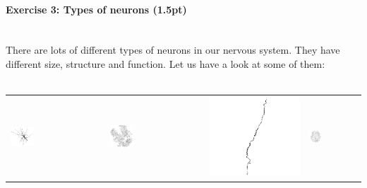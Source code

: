 \documentclass[a4paper,11pt]{article}
\newenvironment{exercise}[3]{\paragraph{Exercise #1: #2 (#3pt)}\ \\}{
\medskip}
\begin{document}
\begin{exercise}{3}{Types of neurons}{1.5}
There are lots of different types of neurons in our nervous system. They have different size, structure and function. Let us have a look at some of them:\\
\ \\
\begin{tabular}{p{3.7cm} p{3.7cm} p{3.7cm} p{3.7cm}}
\includegraphics[width=0.25\textwidth]{pyramidal2.png} &
\includegraphics[width=0.25\textwidth]{purkinje.png} &
\includegraphics[height=0.25\textwidth]{spindle.png} &
\includegraphics[width=0.25\textwidth]{amacrine.png}\\


\end{tabular}
\end{exercise}
\end{document}
